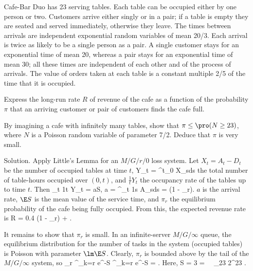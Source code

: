 \begin{exercise}
Cafe-Bar Duo has 23 serving tables. Each table can be occupied either by one person or two. Customers arrive either singly or in a pair; if a table is empty they are seated and served immediately, otherwise they leave. The times between arrivals are independent exponential random variables of mean 20/3. Each arrival is twice as likely to be a single person as a pair. A single customer stays for an exponential time of mean 20, whereas a pair stays for an exponential time of mean 30; all these times are independent of each other and of the process of arrivals. The value of orders taken at each table is a constant multiple 2/5 of the time that it is occupied.

Express the long-run rate $R$ of revenue of the cafe as a function of the probability $\pi$ that an arriving customer or pair of customers finds the cafe full. 

By imagining a cafe with infinitely many tables, show that $\pi \leq  \pro(N \geq  23)$, where $N$ is a Poisson random variable of parameter 7/2. Deduce that $\pi$ is very small.
\end{exercise}


Solution. Apply Little's Lemma for an $M/G/r/0$ loss system. Let $X_t = A_t - D_t$ be the number of occupied tables at time $t$, 
\be
Y_t = \int^t_0 X_sds
\ee
the total number of table-hours occupied over $(0, t)$, and $\frac 1t Y_t$ the occupancy rate of the tables up to time $t$. Then 
\be
\lim_{t\to\infty} \frac 1t Y_t = a\E S, \quad\quad {}\quad a = \int^\infty_t \frac 1s A_sds = \lm (1 - \pi_r).
\ee
$a$ is the arrival rate, $\E S$ is the mean value of the service time, and $\pi_r$ the equilibrium probability of the cafe being fully occupied. From this, the expected revenue rate is
\be
R = 0.4 \times {} (1 - \pi_r) \times \lob {}  +  \rob.
\ee

It remains to show that $\pi_r$ is small. In an infinite-server $M/G/\infty$ queue, the equilibrium distribution for the number of tasks in the system (occupied tables) is Poisson with parameter $\lm \E S$. Clearly, $\pi_r$ is bounded above by the tail of the $M/G/\infty$ system, so 
\be
\pi_r \leq \sum^\infty_{k=r} e^{-\lm\E S} \leq {} \sum^\infty_{k=r} e^{-\lm\E S} = .
\ee
Here,
\be
\lm \E S =  \times {}3 =  \ \ra \ \pi_{23} \leq \lob {}2\rob^{23} .
\ee

